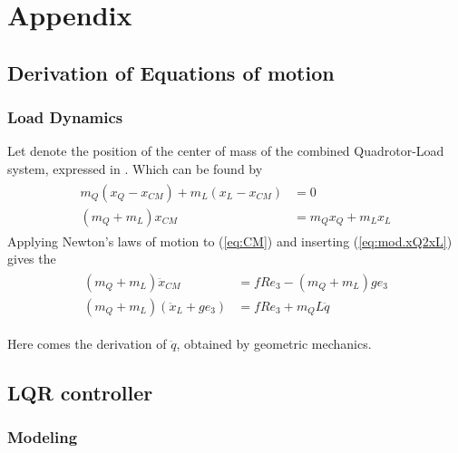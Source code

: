 \chapter{Appendix}

\section{Derivation of Equations of motion}
\subsection{Load Dynamics}\label{sec:app.loaddyn}

Let  denote the position of the center of mass of the combined Quadrotor-Load system, expressed in \IF. Which can be found by
\begin{align}\label{eq:CM}
\begin{split}
m_Q(x_Q-x_{CM})+m_L(x_L-x_{CM})&=0\\
(m_Q+m_L)x_{CM}&=m_Qx_Q+m_Lx_L
\end{split}
\end{align}
Applying Newton's laws of motion to (\ref{eq:CM}) and inserting (\ref{eq:mod.xQ2xL}) gives the 
\begin{align}\label{key}
\begin{split}
(m_Q+m_L)\ddot{x}_{CM}&=fRe_3 - (m_Q+m_L)ge_3\\
(m_Q+m_L)(\ddot{x}_L+ge_3)&= fRe_3+m_QL\ddot{q}
\end{split}
\end{align}

Here comes the derivation of $ \ddot{q} $, obtained by geometric mechanics.

\section{LQR controller}\label{app:lqr}

\subsection{Modeling}
%

